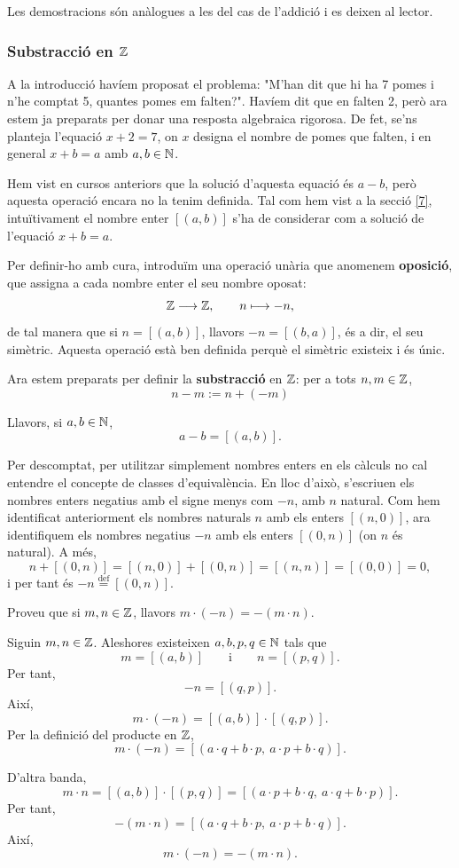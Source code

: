 Les demostracions són anàlogues a les del cas de l'addició i es deixen al lector.

\subsubsection{Substracció en $\mathbb{Z}$}

A la introducció havíem proposat el problema: "M'han dit que hi ha 7 pomes i n'he comptat 5, quantes pomes em falten?". Havíem dit que en falten 2, però ara estem ja preparats per donar una resposta algebraica rigorosa. De fet, se'ns planteja l'equació $x+2=7$, on $x$ designa el nombre de pomes que falten, i en general $x+b=a$ amb $a,b\in \mathbb{N}$.

Hem vist en cursos anteriors que la solució d'aquesta equació és $a-b$, però aquesta operació encara no la tenim definida. Tal com hem vist a la secció \ref{7}, intuïtivament el nombre enter $[(a,b)]$ s'ha de considerar com a solució de l'equació $x+b=a$.

Per definir-ho amb cura, introduïm una operació unària que anomenem \textbf{oposició}, que assigna a cada nombre enter el seu nombre oposat:
\[
\mathbb{Z}\longrightarrow \mathbb{Z},\qquad n\longmapsto -n,
\]
de tal manera que si $n=[(a,b)]$, llavors $-n=[(b,a)]$, és a dir, el seu simètric. Aquesta operació està ben definida perquè el simètric existeix i és únic.

Ara estem preparats per definir la \textbf{substracció} en $\mathbb{Z}$: per a tots $n,m \in \mathbb{Z}$, 
\[
n - m := n + (-m)
\]

Llavors, si $a,b \in \mathbb{N}$, 
\[
a-b=[(a,b)].
\]

Per descomptat, per utilitzar simplement nombres enters en els càlculs no cal entendre el concepte de classes d'equivalència. En lloc d'això, s'escriuen els nombres enters negatius amb el signe menys com $-n$, amb $n$ natural. Com hem identificat anteriorment els nombres naturals $n$ amb els enters $[(n,0)]$, ara identifiquem els nombres negatius $-n$ amb els enters $[(0,n)]$ (on $n$ és natural). A més,
\[
n+[(0,n)]=[(n,0)]+[(0,n)]=[(n,n)]=[(0,0)]=0,
\]
i per tant és $-n\overset{\text{def}}{=}[(0,n)]$.

\begin{exemple}
Proveu que si $m,n\in \mathbb{Z}$, llavors $m\cdot (-n)=-(m\cdot n)$.
\end{exemple}

\begin{solucio}
Siguin $m,n\in\mathbb{Z}$. Aleshores existeixen $a,b,p,q\in\mathbb{N}$ tals que
\[
m=[(a,b)]
\qquad\text{i}\qquad
n=[(p,q)].
\]
Per tant,
\[
-n=[(q,p)].
\]
Així,
\[
m\cdot(-n)=[(a,b)]\cdot[(q,p)].
\]
Per la definició del producte en $\mathbb{Z}$,
\[
m\cdot(-n)
=
[(a\cdot q+b\cdot p,\ a\cdot p+b\cdot q)].
\]

D'altra banda,
\[
m\cdot n=[(a,b)]\cdot[(p,q)]
=
[(a\cdot p+b\cdot q,\ a\cdot q+b\cdot p)].
\]
Per tant,
\[
-(m\cdot n)
=
[(a\cdot q+b\cdot p,\ a\cdot p+b\cdot q)].
\]
Així,
\[
m\cdot(-n)=-(m\cdot n).
\]
\end{solucio}

